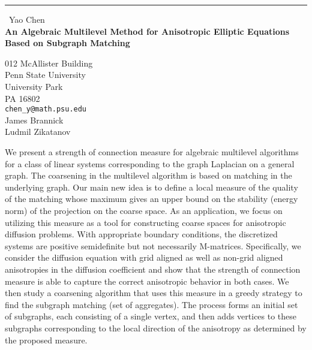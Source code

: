 \documentclass{report}
\begin{document}
\begin{center}
\rule{6in}{1pt} \
{\large Yao Chen \\
{\bf An Algebraic Multilevel Method for Anisotropic Elliptic Equations Based on Subgraph Matching}}

012 McAllister Building \\ Penn State University \\ University Park \\ PA 16802
\\
{\tt chen_y@math.psu.edu}\\
James  Brannick \\
Ludmil  Zikatanov  \end{center}

We present a strength of connection measure for algebraic multilevel
algorithms for a class of linear systems corresponding to the graph
Laplacian on a general graph. The coarsening in the multilevel algorithm
is based on matching in the underlying graph. Our main new idea is to
define a local measure of the quality of the matching whose maximum gives
an upper bound on the stability (energy norm) of the projection on the
coarse space. As an application, we focus on utilizing this measure as a
tool for constructing coarse spaces for anisotropic diffusion problems.
With appropriate boundary conditions, the discretized systems are
positive semidefinite but not necessarily M-matrices. Specifically, we
consider the diffusion equation with grid aligned as well as non-grid
aligned anisotropies in the diffusion coefficient and show that the
strength of connection measure is able to capture the correct anisotropic
behavior in both cases. We then study a coarsening algorithm that uses
this measure in a greedy strategy to find the subgraph matching (set of
aggregates). The process forms an initial set of subgraphs, each
consisting of a single vertex, and then adds vertices to these subgraphs
corresponding to the local direction of the anisotropy as determined by
the proposed measure.
\end{document}
